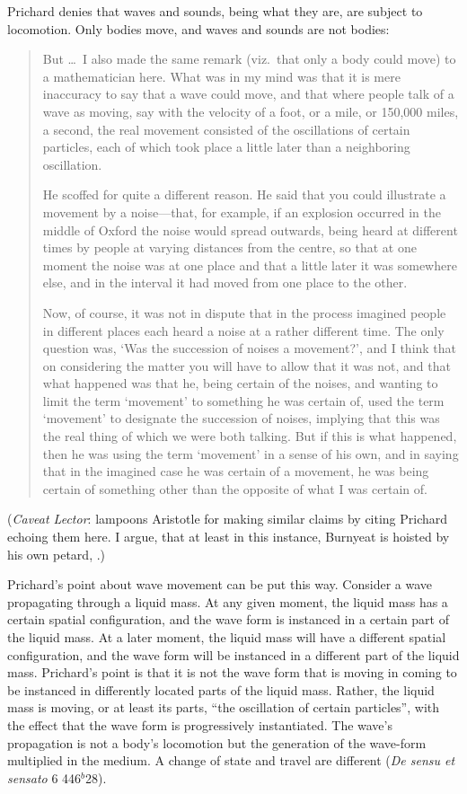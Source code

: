 Prichard denies that waves and sounds, being what they are, are subject to locomotion. Only bodies move, and waves and sounds are not bodies:
\begin{quotation}
	But \dots\ I also made the same remark (viz.\ that only a body could move) to a mathematician here. What was in my mind was that it is mere inaccuracy to say that a wave could move, and that where people talk of a wave as moving, say with the velocity of a foot, or a mile, or 150,000 miles, a second, the real movement consisted of the oscillations of certain particles, each of which took place a little later than a neighboring oscillation.
	
	He scoffed for quite a different reason. He said that you could illustrate a movement by a noise---that, for example, if an explosion occurred in the middle of Oxford the noise would spread outwards, being heard at different times by people at varying distances from the centre, so that at one moment the noise was at one place and that a little later it was somewhere else, and in the interval it had moved from one place to the other.
	
	Now, of course, it was not in dispute that in the process imagined people in different places each heard a noise at a rather different time. The only question was, `Was the succession of noises a movement?', and I think that on considering the matter you will have to allow that it was not, and that what happened was that he, being certain of the noises, and wanting to limit the term `movement' to something he was certain of, used the term `movement' to designate the succession of noises, implying that this was the real thing of which we were both talking. But if this is what happened, then he was using the term `movement' in a sense of his own, and in saying that in the imagined case he was certain of a movement, he was being certain of something other than the opposite of what I was certain of. \citep[99]{Prichard:1950kx}
\end{quotation}
(\emph{Caveat Lector}: \citealt[430 n. 29, appendix,]{Burnyeat:1995fk} lampoons Aristotle for making similar claims by citing Prichard echoing them here. I argue, that at least in this instance, Burnyeat is hoisted by his own petard, \citealt[chapter 3.2]{Kalderon:2015fr}.)

Prichard's point about wave movement can be put this way. Consider a wave propagating through a liquid mass. At any given moment, the liquid mass has a certain spatial configuration, and the wave form is instanced in a certain part of the liquid mass. At a later moment, the liquid mass will have a different spatial configuration, and the wave form will be instanced in a different part of the liquid mass. Prichard's point is that it is not the wave form that is moving in coming to be instanced in differently located parts of the liquid mass. Rather, the liquid mass is moving, or at least its parts, ``the oscillation of certain particles'', with the effect that the wave form is progressively instantiated. The wave's propagation is not a body's locomotion but the generation of the wave-form multiplied in the medium. A change of state and travel are different (\emph{De sensu et sensato} 6 446\( ^{b} \)28).

